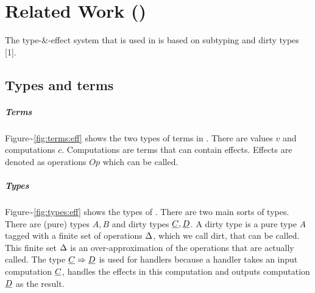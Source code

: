 \documentclass[master=cws,masteroption=ai, english]{kulemt}
\begin{document}
\chapter{\texorpdfstring{Related Work
(\eff)}{Related Work ()}}\label{related-work}

The type-\&-effect system that is used in \eff is based on subtyping and
dirty types {[}1{]}.

\section{Types and terms}\label{types-and-terms}

\paragraph{Terms}

Figure\textasciitilde{}\ref{fig:terms:eff} shows the two types of terms
in \eff. There are values \(v\) and computations \(c\). Computations are
terms that can contain effects. Effects are denoted as operations \(Op\)
which can be called.

\paragraph{Types}

Figure\textasciitilde{}\ref{fig:types:eff} shows the types of \eff.
There are two main sorts of types. There are (pure) types \(A, B\) and
dirty types \(\underline{C}, \underline{D}\). A dirty type is a pure type \(A\) tagged with a
finite set of operations \(\Delta\), which we call dirt, that can be
called. This finite set \(\Delta\) is an over-approximation of the
operations that are actually called. The type \(\underline{C} \Rightarrow \underline{D}\) is used for
handlers because a handler takes an input computation \(\underline{C}\), handles
the effects in this computation and outputs computation \(\underline{D}\) as the
result.
\end{document}
